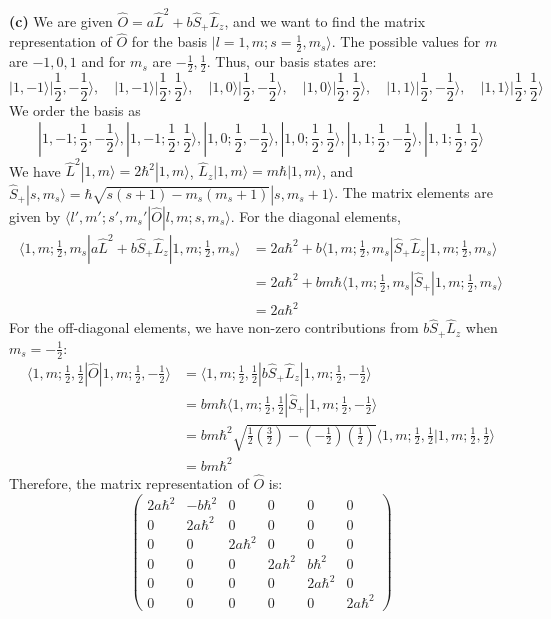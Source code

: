 \documentclass{article}
\begin{document}
\textbf{(c)} We are given \(\hat{O} = a \hat{L}^2 + b \hat{S}_+ \hat{L}_z\), and we want to find the matrix representation of \(\hat{O}\) for the basis \(|l=1, m; s=\frac{1}{2}, m_s\rangle\). The possible values for \(m\) are \(-1, 0, 1\) and for \(m_s\) are \(-\frac{1}{2}, \frac{1}{2}\). Thus, our basis states are:
\[
|1, -1\rangle |\frac{1}{2}, -\frac{1}{2}\rangle, \quad |1, -1\rangle |\frac{1}{2}, \frac{1}{2}\rangle, \quad |1, 0\rangle |\frac{1}{2}, -\frac{1}{2}\rangle, \quad |1, 0\rangle |\frac{1}{2}, \frac{1}{2}\rangle, \quad |1, 1\rangle |\frac{1}{2}, -\frac{1}{2}\rangle, \quad |1, 1\rangle |\frac{1}{2}, \frac{1}{2}\rangle
\]
We order the basis as
\[
|1, -1; \frac{1}{2}, -\frac{1}{2}\rangle, |1, -1; \frac{1}{2}, \frac{1}{2}\rangle, |1, 0; \frac{1}{2}, -\frac{1}{2}\rangle, |1, 0; \frac{1}{2}, \frac{1}{2}\rangle, |1, 1; \frac{1}{2}, -\frac{1}{2}\rangle, |1, 1; \frac{1}{2}, \frac{1}{2}\rangle
\]
We have \(\hat{L}^2 |1, m\rangle = 2\hbar^2 |1, m\rangle\), \(\hat{L}_z |1, m\rangle = m \hbar |1, m\rangle\), and \(\hat{S}_+ |s, m_s\rangle = \hbar \sqrt{s(s+1) - m_s(m_s+1)} |s, m_s+1\rangle\).
The matrix elements are given by \(\langle l', m'; s', m_s' | \hat{O} | l, m; s, m_s \rangle\).
For the diagonal elements,
\[
\begin{aligned}
\langle 1, m; \frac{1}{2}, m_s | a \hat{L}^2 + b \hat{S}_+ \hat{L}_z | 1, m; \frac{1}{2}, m_s \rangle &= 2 a \hbar^2 + b \langle 1, m; \frac{1}{2}, m_s | \hat{S}_+ \hat{L}_z | 1, m; \frac{1}{2}, m_s \rangle \\
&= 2 a \hbar^2 + b m \hbar \langle 1, m; \frac{1}{2}, m_s | \hat{S}_+ | 1, m; \frac{1}{2}, m_s \rangle \\
&= 2 a \hbar^2
\end{aligned}
\]
For the off-diagonal elements, we have non-zero contributions from \(b \hat{S}_+ \hat{L}_z\) when \(m_s = -\frac{1}{2}\):
\[
\begin{aligned}
\langle 1, m; \frac{1}{2}, \frac{1}{2} | \hat{O} | 1, m; \frac{1}{2}, -\frac{1}{2} \rangle &= \langle 1, m; \frac{1}{2}, \frac{1}{2} | b \hat{S}_+ \hat{L}_z | 1, m; \frac{1}{2}, -\frac{1}{2} \rangle \\
&= b m \hbar \langle 1, m; \frac{1}{2}, \frac{1}{2} | \hat{S}_+ | 1, m; \frac{1}{2}, -\frac{1}{2} \rangle \\
&= b m \hbar^2 \sqrt{\frac{1}{2}(\frac{3}{2}) - (-\frac{1}{2})(\frac{1}{2})} \langle 1, m; \frac{1}{2}, \frac{1}{2} | 1, m; \frac{1}{2}, \frac{1}{2} \rangle \\
&= b m \hbar^2
\end{aligned}
\]
Therefore, the matrix representation of \(\hat{O}\) is:
\[
\begin{pmatrix}
2a\hbar^2 & -b\hbar^2 & 0 & 0 & 0 & 0 \\
0 & 2a\hbar^2 & 0 & 0 & 0 & 0 \\
0 & 0 & 2a\hbar^2 & 0 & 0 & 0 \\
0 & 0 & 0 & 2a\hbar^2 & b\hbar^2 & 0 \\
0 & 0 & 0 & 0 & 2a\hbar^2 & 0 \\
0 & 0 & 0 & 0 & 0 & 2a\hbar^2
\end{pmatrix}
\]
\end{document}
